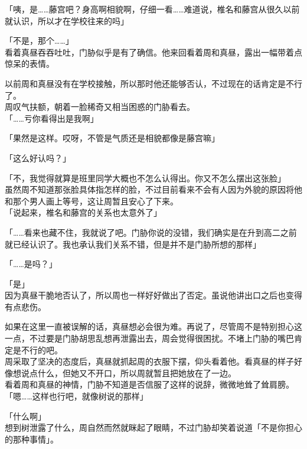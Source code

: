 「咦，是……藤宫吧？身高啊相貌啊，仔细一看……难道说，椎名和藤宫从很久以前就认识，所以才在学校往来的吗」

「不是，那个……」\\

看着真昼吞吞吐吐，门胁似乎是有了确信。他来回看着周和真昼，露出一幅带着点惊呆的表情。

以前周和真昼没有在学校接触，所以那时他还能够否认，不过现在的话肯定是不行了。\\

周叹气扶额，朝着一脸稀奇又相当困惑的门胁看去。\\

「……亏你看得出是我啊」

「果然是这样。哎呀，不管是气质还是相貌都像是藤宫嘛」

「这么好认吗？」

「不，我觉得就算是班里同学大概也不怎么认得出。你又不怎么摆出这张脸」\\

虽然周不知道那张脸具体指怎样的脸，不过目前看来不会有人因为外貌的原因将他和那个男人画上等号，这让周暂且安心了下来。\\

「说起来，椎名和藤宫的关系也太意外了」

「……看来也藏不住，我就说了吧。门胁你说的没错，我们确实是在升到高二之前就已经认识了。我也承认我们关系不错，但是并不是门胁所想的那样」

「……是吗？」

「是」\\

因为真昼干脆地否认了，所以周也一样好好做出了否定。虽说他讲出口之后也变得有点悲伤。

如果在这里一直被误解的话，真昼想必会很为难。再说了，尽管周不是特别担心这一点，不过要是门胁胡思乱想再泄露出去，周会觉得很困扰。不堵上门胁的嘴巴肯定是不行的吧。\\

周采取了坚决的态度后，真昼就抓起周的衣服下摆，仰头看着他。看真昼的样子好像想说点什么，但她又不开口，所以周就暂且把她放在了一边。\\

看着周和真昼的神情，门胁不知道是否信服了这样的说辞，微微地耸了耸肩膀。\\

「嗯……这样也行吧，就像树说的那样」

「什么啊」\\

想到树泄露了什么，周自然而然就眯起了眼睛，不过门胁却笑着说道「不是你担心的那种事情」。\\

